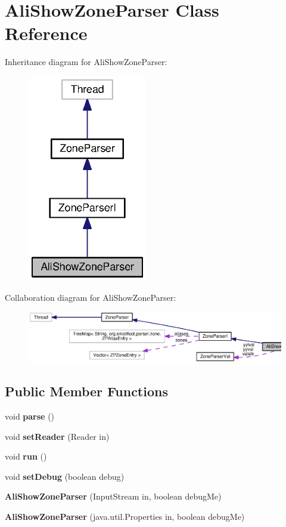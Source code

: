 \section{Ali\+Show\+Zone\+Parser Class Reference}
\label{classorg_1_1smallfoot_1_1parser_1_1zone_1_1AliShowZoneParser}


Inheritance diagram for Ali\+Show\+Zone\+Parser\+:\nopagebreak
\begin{figure}[H]
\begin{center}
\leavevmode
\includegraphics[width=148pt]{classorg_1_1smallfoot_1_1parser_1_1zone_1_1AliShowZoneParser__inherit__graph}
\end{center}
\end{figure}


Collaboration diagram for Ali\+Show\+Zone\+Parser\+:\nopagebreak
\begin{figure}[H]
\begin{center}
\leavevmode
\includegraphics[width=350pt]{classorg_1_1smallfoot_1_1parser_1_1zone_1_1AliShowZoneParser__coll__graph}
\end{center}
\end{figure}
\subsection*{Public Member Functions}
\begin{DoxyCompactItemize}
\item 
void {\bf parse} ()
\item 
void {\bf set\+Reader} (Reader in)
\item 
void {\bf run} ()
\item 
void {\bf set\+Debug} (boolean debug)
\item 
{\bf Ali\+Show\+Zone\+Parser} (Input\+Stream in, boolean debug\+Me)
\item 
{\bf Ali\+Show\+Zone\+Parser} (java.\+util.\+Properties in, boolean debug\+Me)
\end{DoxyCompactItemize}

